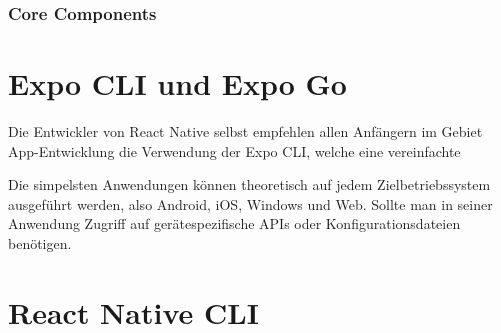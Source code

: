 \subsubsection{Core Components}


\section{Expo CLI und Expo Go}
Die Entwickler von React Native selbst empfehlen allen Anfängern im Gebiet App-Entwicklung die
Verwendung der Expo CLI, welche eine vereinfachte 

Die simpelsten Anwendungen können theoretisch auf jedem Zielbetriebssystem ausgeführt werden, also
Android, iOS, Windows und Web. Sollte man in seiner Anwendung Zugriff auf gerätespezifische APIs
oder Konfigurationsdateien benötigen.

\section{React Native CLI}